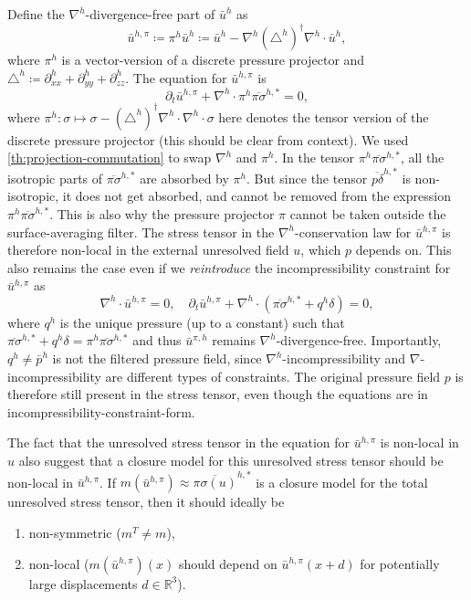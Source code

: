 \documentclass[preprint,twocolumn,5p]{elsarticle}
\begin{document}
Define the $\nabla^h$-divergence-free part of $\bar{u}^h$ as
\begin{equation}
    \bar{u}^{h, \pi} \coloneq \pi^h \bar{u}^h \coloneq
    \bar{u}^h - \nabla^h \left( \triangle^h \right)^\dagger \nabla^h \cdot \bar{u}^h,
\end{equation}
where $\pi^h$
is a vector-version of a discrete pressure projector 
and $\triangle^h \coloneq \partial^h_{x x} + \partial^h_{y y} + \partial^h_{z z}$.
The equation for $\bar{u}^{h, \pi}$ is
\begin{equation}
    \partial_t \bar{u}^{h, \pi} +
    \nabla^h \cdot \pi^h \overline{\pi \sigma}^{h, *} = 0,
\end{equation}
where
$\pi^h : \sigma \mapsto \sigma -
( \triangle^h )^\dagger \nabla^h \cdot \nabla^h \cdot \sigma$
here denotes the tensor version of the discrete pressure projector
(this should be clear from context).
We used \cref{th:projection-commutation} to swap $\nabla^h$ and $\pi^h$.
In the tensor $\pi^h \overline{\pi \sigma}^{h, *}$,
all the isotropic parts of $\overline{\pi \sigma}^{h, *}$ are absorbed by $\pi^h$.
But since the tensor $\overline{p \delta}^{h, *}$ is non-isotropic,
it does not get absorbed, and cannot be removed from the expression
$\pi^h \overline{\pi \sigma}^{h, *}$.
This is also why the pressure projector $\pi$ cannot be
taken outside the surface-averaging filter.
The stress tensor in the $\nabla^h$-conservation law for $\bar{u}^{h, \pi}$ is therefore
non-local in the external unresolved field $u$, which $p$ depends on.
This also remains the case even if we \emph{reintroduce} the incompressibility
constraint for $\bar{u}^{h, \pi}$ as
\begin{equation}
    \nabla^h \cdot \bar{u}^{h, \pi} = 0, \quad
    \partial_t \bar{u}^{h, \pi} + \nabla^h \cdot
    \left( \overline{\pi \sigma}^{h, *} + q^h \delta \right) = 0,
\end{equation}
where $q^h$ is the unique pressure (up to a constant) such that
$\overline{\pi \sigma}^{h, *} + q^h \delta = \pi^h \overline{\pi \sigma}^{h, *}$
and thus $\bar{u}^{\pi, h}$ remains $\nabla^h$-divergence-free.
Importantly, $q^h \neq \bar{p}^h$ is not the filtered pressure field,
since $\nabla^h$-incompressibility and $\nabla$-incompressibility are different
types of constraints.
The original pressure field $p$ is therefore still present in the stress
tensor, even though the equations are in incompressibility-constraint-form.

The fact that the unresolved stress tensor in the equation for
$\bar{u}^{h, \pi}$ is non-local in $u$
also suggest that a closure model for this unresolved stress tensor should be
non-local in $\bar{u}^{h, \pi}$.
If $m(\bar{u}^{h, \pi}) \approx \overline{\pi \sigma(u)}^{h, *}$
is a closure model for the total unresolved stress tensor,
then it should ideally be
\begin{enumerate}
    \item non-symmetric ($m^T \neq m$),
    \item non-local ($m(\bar{u}^{h, \pi})(x)$
        should depend on $\bar{u}^{h, \pi}(x + d)$
        for potentially large displacements $d \in \mathbb{R}^3$).
\end{enumerate}
\end{document}
